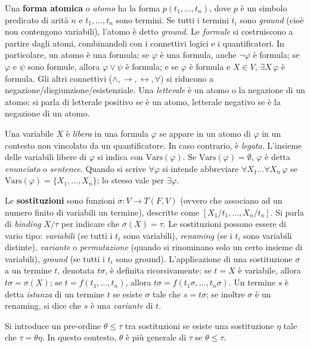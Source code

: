 \documentclass[12pt]{article}
\begin{document}
Una \textbf{forma atomica} o \emph{atomo} ha la forma $p(t_1,\ldots,t_n)$, dove $p$ è un simbolo predicato di arità $n$ e $t_1,\ldots,t_n$ sono termini. Se tutti i termini $t_i$ sono \emph{ground} (cioè non contengono variabili), l'atomo è detto \emph{ground}. Le \emph{formule} si costruiscono a partire dagli atomi, combinandoli con i connettivi logici e i quantificatori. In particolare, un atomo è una formula; se $\varphi$ è una formula, anche $\neg\varphi$ è formula; se $\varphi$ e $\psi$ sono formule, allora $\varphi\lor\psi$ è formula; e se $\varphi$ è formula e $X\in V$, $\exists X\,\varphi$ è formula. Gli altri connettivi ($\land,\rightarrow,\leftrightarrow,\forall$) si riducono a negazione/disgiunzione/esistenziale. Una \emph{letterale} è un atomo o la negazione di un atomo; si parla di letterale positivo se è un atomo, letterale negativo se è la negazione di un atomo.

Una variabile $X$ è \emph{libera} in una formula $\varphi$ se appare in un atomo di $\varphi$ in un contesto non vincolato da un quantificatore. In caso contrario, è \emph{legata}. L'insieme delle variabili libere di $\varphi$ si indica con $\mathrm{Vars}(\varphi)$. Se $\mathrm{Vars}(\varphi)=\emptyset$, $\varphi$ è detta \emph{enunciato} o \emph{sentence}. Quando si scrive $\forall \varphi$ si intende abbreviare $\forall X_1 \dots \forall X_n \,\varphi$ se $\mathrm{Vars}(\varphi)=\{X_1,\dots,X_n\}$; lo stesso vale per $\exists \varphi$.

Le \textbf{sostituzioni} sono funzioni $\sigma:V\to T(F,V)$ (ovvero che associano ad un numero finito di variabili un termine), descritte come $[X_1/t_1,\dots,X_n/t_n]$. Si parla di \emph{binding} $X/\tau$ per indicare che $\sigma(X)=\tau$. Le sostituzioni possono essere di vario tipo: \emph{variabili} (se tutti i $t_i$ sono variabili), \emph{renaming} (se i $t_i$ sono variabili distinte), \emph{variante} o \emph{permutazione} (quando si rinominano solo un certo insieme di variabili), \emph{ground} (se tutti i $t_i$ sono ground). L'applicazione di una sostituzione $\sigma$ a un termine $t$, denotata $t\sigma$, è definita ricorsivamente: se $t=X$ è variabile, allora $t\sigma=\sigma(X)$; se $t=f(t_1,\dots,t_n)$, allora $t\sigma = f(t_1\sigma,\dots,t_n\sigma)$. Un termine $s$ è detta \emph{istanza} di un termine $t$ se esiste $\sigma$ tale che $s = t\sigma$; se inoltre $\sigma$ è un renaming, si dice che $s$ è una \emph{variante} di $t$.

Si introduce un pre-ordine $\theta \leq \tau$ tra sostituzioni se esiste una sostituzione $\eta$ tale che $\tau = \theta \eta$. In questo contesto, $\theta$ è più generale di $\tau$ se $\theta \leq \tau$.
\end{document}
